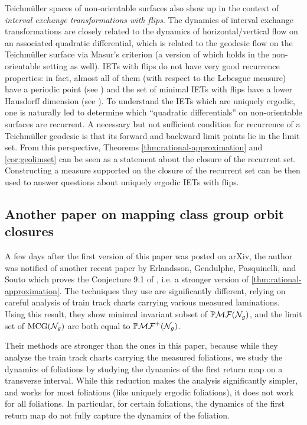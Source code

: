 Teichm\"uller spaces of non-orientable surfaces also show up in the context of \emph{interval exchange transformations with flips}.
The dynamics of interval exchange transformations are closely related to the dynamics of horizontal/vertical flow on an associated quadratic differential, which is related to the geodesic flow on the Teichm\"uller surface via Masur's criterion (a version of which holds in the non-orientable setting as well).
IETs with flips do not have very good recurrence properties: in fact, almost all of them (with respect to the Lebesgue measure) have a periodic point (see \cite{nogueira_1989}) and the set of minimal IETs with flips have a lower Hausdorff dimension (see \cite{skripchenko2018hausdorff}).
To understand the IETs which are uniquely ergodic, one is naturally led to determine which ``quadratic differentials'' on non-orientable surfaces are recurrent.
A necessary but not sufficient condition for recurrence of a Teichm\"uller geodesic is that its forward and backward limit points lie in the limit set.
From this perspective, Theorems \ref{thm:rational-approximation} and \ref{cor:geolimset} can
be seen as a statement about the closure of the recurrent set.
Constructing a measure supported on the closure of the recurrent set can be then used to answer questions about uniquely ergodic IETs with flips.

\subsection*{Another paper on mapping class group orbit closures}
A few days after the first version of this paper was posted on arXiv, the author was notified of another recent paper by Erlandsson, Gendulphe, Pasquinelli, and Souto \cite{erlandsson2021mapping} which proves the Conjecture 9.1 of \cite{gendulphe2017whats}, i.e. a stronger version of \autoref{thm:rational-approximation}.
The techniques they use are significantly different, relying on careful analysis of train track charts carrying various measured laminations.
Using this result, they show minimal invariant subset of $\mathbb{P}\mathcal{MF}(\mathcal{N}_g)$, and the limit set of $\mathrm{MCG}(\mathcal{N}_g)$ are both equal to $\mathbb{P}\mathcal{MF}^+(\mathcal{N}_g)$.

Their methods are stronger than the ones in this paper, because while they analyze the train track charts carrying the measured foliations, we study the dynamics of foliations by studying the dynamics of the first return map on a transverse interval.
While this reduction makes the analysis significantly simpler, and works for most foliations (like uniquely ergodic foliations), it does not work for all foliations.
In particular, for certain foliations, the dynamics of the first return map do not fully capture the dynamics of the foliation.


